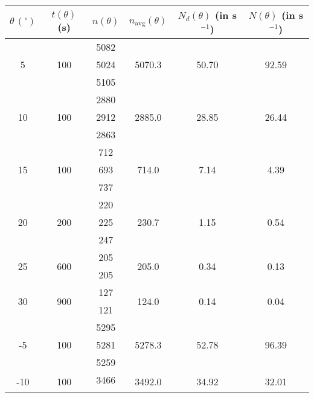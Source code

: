 \begin{table}[]
    \centering
    \begin{tabular}{|c|c|c|c|c|c|}
    \hline
    $\theta\,(^\circ)$ & $t(\theta)$ (s) & $n(\theta)$ & $n_\text{avg}(\theta)$ & $N_d(\theta)$ (in s$^{-1}$) & $N(\theta)$ (in s$^{-1}$) \\ \hline
    \multirow{3}{*}{5} & \multirow{3}{*}{100} & 5082 & \multirow{3}{*}{5070.3} & \multirow{3}{*}{50.70} & \multirow{3}{*}{92.59} \\ \cline{3-3}
     &  & 5024 &  &  &  \\ \cline{3-3}
     &  & 5105 &  &  &  \\ \hline
    \multirow{3}{*}{10} & \multirow{3}{*}{100} & 2880 & \multirow{3}{*}{2885.0} & \multirow{3}{*}{28.85} & \multirow{3}{*}{26.44} \\ \cline{3-3}
     &  & 2912 &  &  &  \\ \cline{3-3}
     &  & 2863 &  &  &  \\ \hline
    \multirow{3}{*}{15} & \multirow{3}{*}{100} & 712 & \multirow{3}{*}{714.0} & \multirow{3}{*}{7.14} & \multirow{3}{*}{4.39} \\ \cline{3-3}
     &  & 693 &  &  &  \\ \cline{3-3}
     &  & 737 &  &  &  \\ \hline
    \multirow{3}{*}{20} & \multirow{3}{*}{200} & 220 & \multirow{3}{*}{230.7} & \multirow{3}{*}{1.15} & \multirow{3}{*}{0.54} \\ \cline{3-3}
     &  & 225 &  &  &  \\ \cline{3-3}
     &  & 247 &  &  &  \\ \hline
    \multirow{2}{*}{25} & \multirow{2}{*}{600} & 205 & \multirow{2}{*}{205.0} & \multirow{2}{*}{0.34} & \multirow{2}{*}{0.13} \\ \cline{3-3}
     &  & 205 &  &  &  \\ \hline
    \multirow{2}{*}{30} & \multirow{2}{*}{900} & 127 & \multirow{2}{*}{124.0} & \multirow{2}{*}{0.14} & \multirow{2}{*}{0.04} \\ \cline{3-3}
     &  & 121 &  &  &  \\ \hline
    \multirow{3}{*}{-5} & \multirow{3}{*}{100} & 5295 & \multirow{3}{*}{5278.3} & \multirow{3}{*}{52.78} & \multirow{3}{*}{96.39} \\ \cline{3-3}
     &  & 5281 &  &  &  \\ \cline{3-3}
     &  & 5259 &  &  &  \\ \hline
    \multirow{2}{*}{-10} & \multirow{2}{*}{100} & 3466 & \multirow{2}{*}{3492.0} & \multirow{2}{*}{34.92} & \multirow{2}{*}{32.01} \\ \cline{3-3}

\end{tabular}
\end{table}
